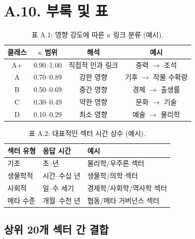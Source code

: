\documentclass[13pt,a4paper]{article}
\begin{document}
	\section*{A.10. 부록 및 표}
	
	\begin{table}[htbp]
		\centering
		\small
		\begin{tabular}{cccc}
			\toprule
			\textbf{클래스} & \textbf{$\kappa$ 범위} & \textbf{해석} & \textbf{예시} \\
			\midrule
			A+ & 0.90--1.00 & 직접적 인과 링크 & 중력 $\rightarrow$ 조석 \\
			A  & 0.70--0.89 & 강한 영향 & 기후 $\rightarrow$ 작물 수확량 \\
			B  & 0.50--0.69 & 중간 영향 & 경제 $\rightarrow$ 출생률 \\
			C  & 0.30--0.49 & 약한 영향 & 문화 $\rightarrow$ 기술 \\
			D  & 0.10--0.29 & 최소 영향 & 예술 $\rightarrow$ 물리학 \\
			\bottomrule
		\end{tabular}
		\caption{표 A.1: 영향 강도에 따른 $\kappa$ 링크 분류 (예시).}
	\end{table}
	
	\begin{table}[htbp]
		\centering
		\small
		\begin{tabular}{p{}p{}p{}}
			\toprule
			\textbf{섹터 유형} & \textbf{응답 시간} & \textbf{예시} \\
			\midrule
			기초 & 초--년 & 물리학/우주론 섹터 \\
			생물학적 & 시간--수십 년 & 생물학/의학 섹터 \\
			사회적 & 일--수 세기 & 경제학/사회학/역사학 섹터 \\
			메타 수준 & 개월--수천 년 & 협동/메타 거버넌스 섹터 \\
			\bottomrule
		\end{tabular}
		\caption{표 A.2: 대표적인 섹터 시간 상수 (예시).}
	\end{table}
	
	\subsection*{상위 20개 섹터 간 결합}
	
\end{document}
